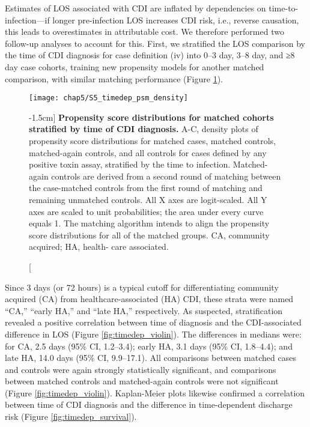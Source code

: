 Estimates of LOS associated with CDI are inflated by dependencies on time-to-infection—if longer pre-infection LOS increases CDI risk, i.e., reverse causation, this leads to overestimates in attributable cost.\autocite{Mitchell2014,Stevens2015} We therefore performed two follow-up analyses to account for this. First, we stratified the LOS comparison by the time of CDI diagnosis for case definition (iv) into 0–3 day, 3–8 day, and ≥8 day case cohorts, training new propensity models for another matched comparison, with similar matching performance (Figure \ref{fig:timedep_psm_density}).
\begin{figure}[htb]
  \texttt{[image: chap5/S5\_timedep\_psm\_density]}
  \caption[Propensity score distributions for matched cohorts stratified by time of \emph{C. difficile} infection diagnosis][-1.5cm]{
    \textbf{Propensity score distributions for matched cohorts stratified by time of CDI diagnosis.} A-C, density plots of propensity score distributions for matched cases, matched controls, matched-again controls, and all controls for cases defined by any positive toxin assay, stratified by the time to infection. Matched-again controls are derived from a second round of matching between the case-matched controls from the first round of matching and remaining unmatched controls. All X axes are logit-scaled. All Y axes are scaled to unit probabilities; the area under every curve equals 1. The matching algorithm intends to align the propensity score distributions for all of the matched groups. CA, community acquired; HA, health- care associated.
  }
  \label{fig:timedep_psm_density}
\end{figure}
Since 3 days (or 72 hours) is a typical cutoff for differentiating community acquired (CA) from healthcare-associated (HA) CDI,\autocite{Longtin2016,Polage2015} these strata were named “CA,” “early HA,” and “late HA,” respectively. As suspected, stratification revealed a positive correlation between time of diagnosis and the CDI-associated difference in LOS (Figure \ref{fig:timedep_violin}). The differences in medians were: for CA, 2.5 days (95\% CI, 1.2–3.4); early HA, 3.1 days (95\% CI, 1.8–4.4); and late HA, 14.0 days (95\% CI, 9.9–17.1). All comparisons between matched cases and controls were again strongly statistically significant, and comparisons between matched controls and matched-again controls were not significant (Figure \ref{fig:timedep_violin}). Kaplan-Meier plots likewise confirmed a correlation between time of CDI diagnosis and the difference in time-dependent discharge risk (Figure \ref{fig:timedep_survival}).


